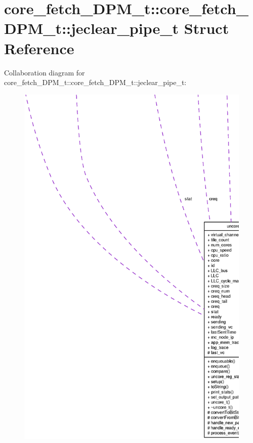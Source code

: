 \section{core\_\-fetch\_\-DPM\_\-t::core\_\-fetch\_\-DPM\_\-t::jeclear\_\-pipe\_\-t Struct Reference}
\label{structcore__fetch__DPM__t_1_1jeclear__pipe__t}
Collaboration diagram for core\_\-fetch\_\-DPM\_\-t::core\_\-fetch\_\-DPM\_\-t::jeclear\_\-pipe\_\-t:\nopagebreak
\begin{figure}[H]
\begin{center}
\leavevmode
\includegraphics[width=400pt]{structcore__fetch__DPM__t_1_1jeclear__pipe__t__coll__graph}
\end{center}
\end{figure}
